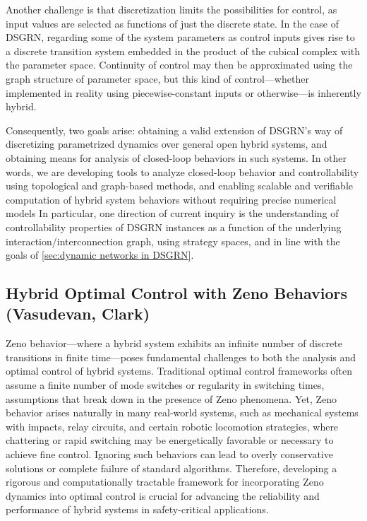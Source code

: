\documentclass[letterpaper,11pt]{article}
\begin{document}
Another challenge is that discretization limits the possibilities for control, as input values are selected as functions of just the discrete state.
In the case of DSGRN, regarding some of the system parameters as control inputs gives rise to a discrete transition system embedded in the product of the cubical complex with the parameter space.
Continuity of control may then be approximated using the graph structure of parameter space, but this kind of control---whether implemented in reality using piecewise-constant inputs or otherwise---is inherently hybrid.


Consequently, two goals arise: obtaining a valid extension of DSGRN's way of discretizing parametrized dynamics over general open hybrid systems, and obtaining means for analysis of closed-loop behaviors in such systems.
In other words, we are developing tools to analyze closed-loop behavior and controllability using topological and graph-based methods, and enabling scalable and verifiable computation of hybrid system behaviors without requiring precise numerical models
In particular, one direction of current inquiry is the understanding of controllability properties of DSGRN instances as a function of the underlying interaction/interconnection graph, using strategy spaces, and in line with the goals of \ref{sec:dynamic networks in DSGRN}.

\subsection{Hybrid Optimal Control with Zeno Behaviors (Vasudevan, Clark)}\label{sec:Zeno}

Zeno behavior—where a hybrid system exhibits an infinite number of discrete transitions in finite time—poses fundamental challenges to both the analysis and optimal control of hybrid systems. 
Traditional optimal control frameworks often assume a finite number of mode switches or regularity in switching times, assumptions that break down in the presence of Zeno phenomena. 
Yet, Zeno behavior arises naturally in many real-world systems, such as mechanical systems with impacts, relay circuits, and certain robotic locomotion strategies, where chattering or rapid switching may be energetically favorable or necessary to achieve fine control. 
Ignoring such behaviors can lead to overly conservative solutions or complete failure of standard algorithms. 
Therefore, developing a rigorous and computationally tractable framework for incorporating Zeno dynamics into optimal control is crucial for advancing the reliability and performance of hybrid systems in safety-critical applications. 
\end{document}
